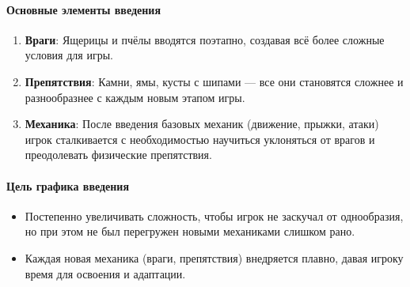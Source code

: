 \documentclass{article}
\begin{document}
\paragraph{Основные элементы введения}
\begin{enumerate}
    \item \textbf{Враги}: Ящерицы и пчёлы вводятся поэтапно, создавая всё более сложные условия для игры.
    \item \textbf{Препятствия}: Камни, ямы, кусты с шипами — все они становятся сложнее и разнообразнее с каждым новым этапом игры.
    \item \textbf{Механика}: После введения базовых механик (движение, прыжки, атаки) игрок сталкивается с необходимостью научиться уклоняться от врагов и преодолевать физические препятствия.
\end{enumerate}

\paragraph{Цель графика введения}
\begin{itemize}
    \item Постепенно увеличивать сложность, чтобы игрок не заскучал от однообразия, но при этом не был перегружен новыми механиками слишком рано.
    \item Каждая новая механика (враги, препятствия) внедряется плавно, давая игроку время для освоения и адаптации.
\end{itemize}
\end{document}
